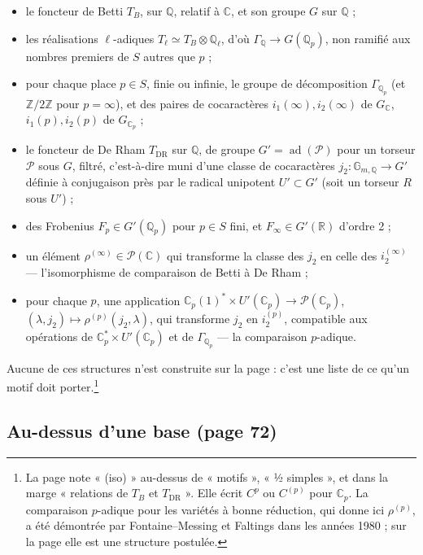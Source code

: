 \documentclass[11pt,a4paper]{article}
\begin{document}
\begin{itemize}
\item le foncteur de Betti $T_{B}$, sur $\mathbb{Q}$, relatif à $\mathbb{C}$,
et son groupe $G$ sur $\mathbb{Q}$ ;
\item les réalisations $\ell$-adiques $T_{\ell} \simeq T_{B} \otimes
\mathbb{Q}_{\ell}$, d'où $\Gamma_{\mathbb{Q}} \to G(\mathbb{Q}_{p})$, non
ramifié aux nombres premiers de $S$ autres que $p$ ;
\item pour chaque place $p \in S$, finie ou infinie, le groupe de
décomposition $\Gamma_{\mathbb{Q}_{p}}$ (et $\mathbb{Z}/2\mathbb{Z}$ pour
$p = \infty$), et des paires de cocaractères $i_{1}(\infty), i_{2}(\infty)$
de $G_{\mathbb{C}}$, $i_{1}(p), i_{2}(p)$ de $G_{\mathbb{C}_{p}}$ ;
\item le foncteur de De Rham $T_{\mathrm{DR}}$ sur $\mathbb{Q}$, de groupe
$G' = \operatorname{ad}(\mathcal{P})$ pour un torseur $\mathcal{P}$ sous
$G$, filtré, c'est-à-dire muni d'une classe de cocaractères
$j_{2}\colon \mathbb{G}_{m,\mathbb{Q}} \to G'$ définie à conjugaison près par
le radical unipotent $U' \subset G'$ (soit un torseur $R$ sous $U'$) ;
\item des Frobenius $F_{p} \in G'(\mathbb{Q}_{p})$ pour $p \in S$ fini, et
$F_{\infty} \in G'(\mathbb{R})$ d'ordre 2 ;
\item un élément $\rho^{(\infty)} \in \mathcal{P}(\mathbb{C})$ qui transforme
la classe des $j_{2}$ en celle des $i_{2}^{(\infty)}$ — l'isomorphisme de
comparaison de Betti à De Rham ;
\item pour chaque $p$, une application
$\mathbb{C}_{p}(1)^{*} \times U'(\mathbb{C}_{p}) \to
\mathcal{P}(\mathbb{C}_{p})$, $(\lambda, j_{2}) \mapsto \rho^{(p)}(j_{2},
\lambda)$, qui transforme $j_{2}$ en $i_{2}^{(p)}$, compatible aux
opérations de $\mathbb{C}_{p}^{*} \times U'(\mathbb{C}_{p})$ et de
$\Gamma_{\mathbb{Q}_{p}}$ — la comparaison $p$-adique.
\end{itemize}

Aucune de ces structures n'est construite sur la page : c'est une liste de
ce qu'un motif doit porter.\footnote{La page note « (iso) » au-dessus de « motifs », « ½ simples », et
dans la marge « relations de $T_{B}$ et $T_{\mathrm{DR}}$ ». Elle écrit
$C^{p}$ ou $C^{(p)}$ pour $\mathbb{C}_{p}$. La comparaison $p$-adique pour les
variétés à bonne réduction, qui donne ici $\rho^{(p)}$, a été démontrée par
Fontaine--Messing et Faltings dans les années 1980 ; sur la page elle est une
structure postulée.}

\subsection*{Au-dessus d'une base (page 72)}
\end{document}
